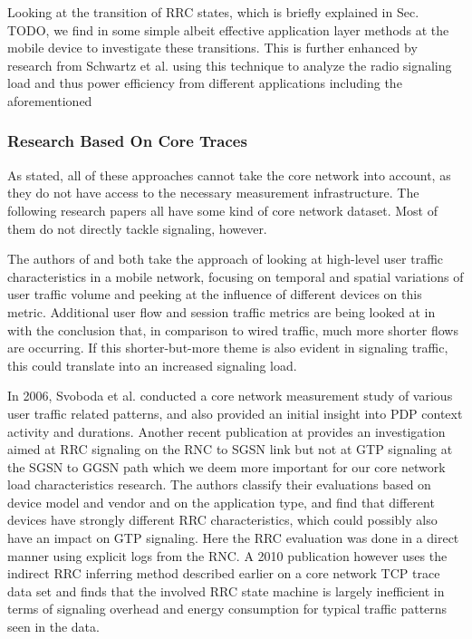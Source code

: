 Looking at the transition of \ac{RRC} states, which is briefly explained in Sec. TODO, we find in \cite{5360763} some simple albeit effective application layer methods at the mobile device to investigate these transitions. This is further enhanced by research from Schwartz et al.\cite{schwartz2013angrybirds} using this technique to analyze the radio signaling load and thus power efficiency from different applications including the aforementioned


\subsubsection{Research Based On Core Traces}

As stated, all of these approaches cannot take the core network into account, as they do not have access to the necessary measurement infrastructure. The following research papers all have some kind of core network dataset. Most of them do not directly tackle signaling, however.

The authors of \cite{shafiq2011characterizing} and \cite{paul2011understanding} both take the approach of looking at high-level user traffic characteristics in a mobile network, focusing on temporal and spatial variations of user traffic volume and peeking at the influence of different devices on this metric. Additional user flow and session traffic metrics are being looked at in \cite{Zhang:2012:UCC:2377677.2377764} with the conclusion that, in comparison to wired traffic, much more shorter flows are occurring. If this shorter-but-more theme is also evident in signaling traffic, this could translate into an increased signaling load.

In 2006, Svoboda et al. \cite{svoboda2006composition} conducted a core network measurement study of various user traffic related patterns, and also provided an initial insight into \ac{PDP} context activity and durations. Another recent publication at \cite{he2012panoramic} provides an investigation aimed at \ac{RRC} signaling on the \ac{RNC} to \ac{SGSN} link but not at \ac{GTP} signaling at the \ac{SGSN} to \ac{GGSN} path which we deem more important for our core network load characteristics research. The authors classify their evaluations based on device model and vendor and on the application type, and find that different devices have strongly different \ac{RRC} characteristics, which could possibly also have an impact on \ac{GTP} signaling. Here the \ac{RRC} evaluation was done in a direct manner using explicit logs from the \ac{RNC}. A 2010 publication\cite{Qian:2010:CRR:1879141.1879159} however uses the indirect \ac{RRC} inferring method described earlier on a core network TCP trace data set and finds that the involved \ac{RRC} state machine is largely inefficient in terms of signaling overhead and energy consumption for typical traffic patterns seen in the data.

